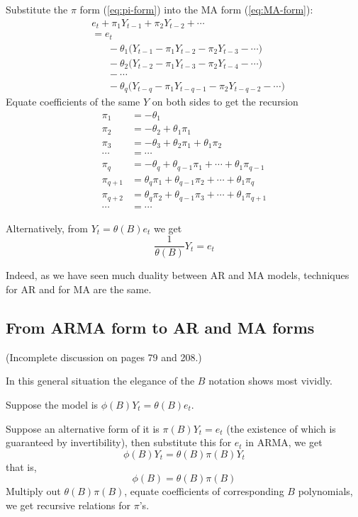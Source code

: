 \documentclass[12pt]{article}
\begin{document}
Substitute the $\pi$ form (\ref{eq:pi-form})
into the MA form (\ref{eq:MA-form}):
\[\begin{split}
& e_t + \pi_1 Y_{t-1} + \pi_2 Y_{t-2} +\dotsb\\
&= e_t\\
&\phantom{\mathrel{=}\;}
    -\theta_1\bigl(Y_{t-1} - \pi_1Y_{t-2} - \pi_2Y_{t-3}
        -\dotsb\bigr)\\
&\phantom{\mathrel{=}\;}
    -\theta_2\bigl(Y_{t-2} - \pi_1Y_{t-3} - \pi_2Y_{t-4}
        -\dotsb\bigr)\\
&\phantom{\mathrel{=}\;}
    -\dotsb\\
&\phantom{\mathrel{=}\;}
    -\theta_q\bigl(Y_{t-q} - \pi_1Y_{t-q-1} - \pi_2Y_{t-q-2}
        -\dotsb\bigr)
\end{split}
\]
Equate coefficients of the same $Y$ on both sides to get
the recursion
\[\begin{split}
\pi_1 &= -\theta_1\\
\pi_2 &= -\theta_2 + \theta_1\pi_1\\
\pi_3 &= -\theta_3 + \theta_2\pi_1 + \theta_1\pi_2\\
\dotsb &= \dotsb\\
\pi_q &= -\theta_q + \theta_{q-1}\pi_1 + \dotsb + \theta_1\pi_{q-1}\\
\pi_{q+1} &= \theta_q\pi_1 + \theta_{q-1}\pi_2 + \dotsb + \theta_1\pi_{q}\\
\pi_{q+2} &= \theta_q\pi_2 + \theta_{q-1}\pi_3 + \dotsb +
    \theta_1\pi_{q+1}\\
\dotsb &= \dotsb
\end{split}
\]


Alternatively,
from
$Y_t = \theta(B) e_t$
we get
\[
\frac{1}{\theta(B)} Y_t = e_t
\]

Indeed, as we have seen much duality between AR and MA models,
techniques for AR and for MA are the same.


\subsection{From ARMA form to AR and MA forms}

(Incomplete discussion on pages 79 and 208.)

In this general situation the elegance of the $B$ notation
shows most vividly.

Suppose the model is $\phi(B) Y_t = \theta(B) e_t$.

Suppose an alternative form of it is
$\pi(B)Y_t = e_t$
(the existence of which is guaranteed by invertibility), then substitute
this for $e_t$ in ARMA, we get
\[
\phi(B) Y_t = \theta(B) \pi(B) Y_t
\]
that is,
\[
\phi(B) = \theta(B) \pi(B)
\]
Multiply out $\theta(B) \pi(B)$,
equate coefficients of corresponding $B$ polynomials,
we get recursive relations for $\pi$'s.
\end{document}
